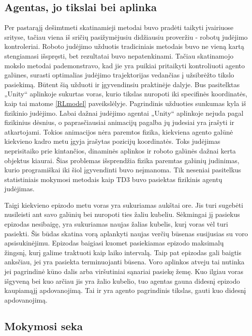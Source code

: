 \documentclass[a4paper, 12pt]{article}
\begin{document}
\subsection{Agentas, jo tikslai bei aplinka}

Per pastarąjį dešimtmeti skatinamieji metodai buvo pradėti taikyti įvairiuose srityse, tačiau viena iš sričių pasižymėjusiu didžiausiu proveržiu - robotų judėjimo kontroleriai. Roboto judėjimo užduotis tradiciniais metodais buvo ne vieną kartą stengiamasi išspręsti, bet rezultatai buvo nepatenkinami. Tačiau skatinamojo mokslo metodai pademonstravo, kad jie yra puikiai pritaikyti kontroliuoti agento galūnes, surasti optimalias judėjimo trajektorijas vedančias į užsibrėžto tikslo pasiekimą. Būtent šią užduoti ir įgyvendinsiu praktinėje dalyje. Bus pasitelktas „Unity“ aplinkoje sukurtas voras, kurio tikslas nuropoti iki specifinės koordinatės, kaip tai matome \ref{RLmodel} paveikslėlyje. Pagrindinis užduoties sunkumas kyla iš fizikinio judėjimo. Labai dažnai judėjimo agentai „Unity“ aplinkoje nejuda pagal fizikinius dėsnius, o paprasčiausiai animacijų pagalba jų judesiai yra įrašyti ir atkartojami. Tokios animacijos nėra paremtos fizika, kiekviena agento galūnė kiekvieno kadro metu įgyja įrašytas pozicijų koordinatės. Toks judėjimas neprisitaiko prie kintančios, dinaminės aplinkos ir roboto galūnės dažnai kerta objektus kiaurai. Šias problemas išsprendžia fizika paremtas galūnių judinimas, kurio programiškai iki šiol įgyvendinti buvo neįmanoma. Tik neseniai pasitelkus statistiniais mokymosi metodais kaip TD3 buvo pasiektas fizikinis agentų judėjimas.

Taigi kiekvieno epizodo metu voras yra sukuriamas aukštai ore. Jis turi sugebėti nusileisti ant savo galūnių bei nuropoti ties žaliu kubeliu. Sėkmingai jį pasiekus epizodas nesibaigę, yra sukuriamas naujas žalias kubelis, kurį voras vėl turi pasiekti. Šis būdas skatina vorą aplankyti naujas verčių būsenas susijusias su voro apsisukinėjimu. Epizodas baigiasi kuomet pasiekiamas epizodo maksimalų žingsnį, kurį galime traktuoti kaip laiko intervalą. Taip pat epizodas gali baigtis anksčiau, jei yra pasiekta terminuojanti būsena. Voro aplinkos atveju tai nutinka jei pagrindinė kūno dalis arba viršutiniai sąnariai pasiekę žemę. Kuo ilgiau voras išgyveną bei kuo arčiau jis yra žalio kubelio, tuo agentas gauna didesnį epizodo kaupiamąjį apdovanojimą. Tai ir yra agento pagrindinis tikslas, gauti kuo didesnį apdovanojimą. 

\subsection{Mokymosi seka}
\end{document}

